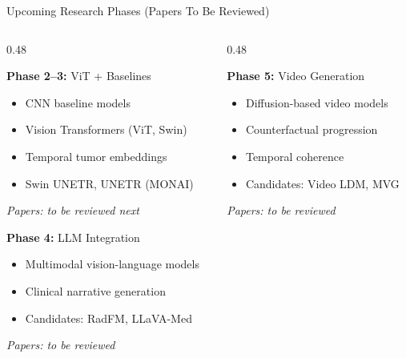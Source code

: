 \documentclass[aspectratio=169,xcolor=dvipsnames]{beamer}
\begin{document}
\begin{frame}{Upcoming Research Phases (Papers To Be Reviewed)}
    \begin{columns}
        \begin{column}{0.48\textwidth}
            \begin{block}{\textbf{Phase 2--3:} ViT + Baselines}
                \small
                \begin{itemize}
                    \item CNN baseline models
                    \item Vision Transformers (ViT, Swin)
                    \item Temporal tumor embeddings
                    \item Swin UNETR, UNETR (MONAI)
                \end{itemize}
                \vspace{0.2em}
                {\scriptsize \textit{Papers: to be reviewed next}}
            \end{block}

            \vspace{0.3em}

            \begin{block}{\textbf{Phase 4:} LLM Integration}
                \small
                \begin{itemize}
                    \item Multimodal vision-language models
                    \item Clinical narrative generation
                    \item Candidates: RadFM, LLaVA-Med
                \end{itemize}
                \vspace{0.2em}
                {\scriptsize \textit{Papers: to be reviewed}}
            \end{block}
        \end{column}

        \begin{column}{0.48\textwidth}
            \begin{block}{\textbf{Phase 5:} Video Generation}
                \small
                \begin{itemize}
                    \item Diffusion-based video models
                    \item Counterfactual progression
                    \item Temporal coherence
                    \item Candidates: Video LDM, MVG
                \end{itemize}
                \vspace{0.2em}
                {\scriptsize \textit{Papers: to be reviewed}}
            \end{block}


\end{column}
\end{columns}
\end{frame}
\end{document}
